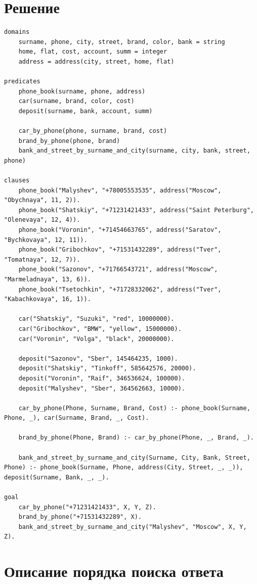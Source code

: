 \documentclass[12pt]{report}
\begin{document}
\section*{Решение}
\begin{lstlisting}
domains
	surname, phone, city, street, brand, color, bank = string
	home, flat, cost, account, summ = integer
	address = address(city, street, home, flat)
		
predicates
	phone_book(surname, phone, address)
	car(surname, brand, color, cost)
	deposit(surname, bank, account, summ)
	
	car_by_phone(phone, surname, brand, cost)
	brand_by_phone(phone, brand)
	bank_and_street_by_surname_and_city(surname, city, bank, street, phone)
	
clauses
	phone_book("Malyshev", "+78005553535", address("Moscow", "Obychnaya", 11, 2)).
	phone_book("Shatskiy", "+71231421433", address("Saint Peterburg", "Olenevaya", 12, 4)).
	phone_book("Voronin", "+71454663765", address("Saratov", "Bychkovaya", 12, 11)).
	phone_book("Gribochkov", "+71531432289", address("Tver", "Tomatnaya", 12, 7)).
	phone_book("Sazonov", "+71766543721", address("Moscow", "Marmeladnaya", 13, 6)).
	phone_book("Tsetochkin", "+71728332062", address("Tver", "Kabachkovaya", 16, 1)).
	
	car("Shatskiy", "Suzuki", "red", 10000000).
	car("Gribochkov", "BMW", "yellow", 15000000).
	car("Voronin", "Volga", "black", 20000000).
	
	deposit("Sazonov", "Sber", 145464235, 1000).
	deposit("Shatskiy", "Tinkoff", 585642576, 20000).
	deposit("Voronin", "Raif", 346536624, 100000).
	deposit("Malyshev", "Sber", 364562663, 10000).
	
	car_by_phone(Phone, Surname, Brand, Cost) :- phone_book(Surname, Phone, _), car(Surname, Brand, _, Cost).
	
	brand_by_phone(Phone, Brand) :- car_by_phone(Phone, _, Brand, _).
	
	bank_and_street_by_surname_and_city(Surname, City, Bank, Street, Phone) :- phone_book(Surname, Phone, address(City, Street, _, _)), deposit(Surname, Bank, _, _).
		
goal
	car_by_phone("+71231421433", X, Y, Z).
	brand_by_phone("+71531432289", X).
	bank_and_street_by_surname_and_city("Malyshev", "Moscow", X, Y, Z).
\end{lstlisting}

\section*{Описание порядка поиска ответа}
\end{document}
